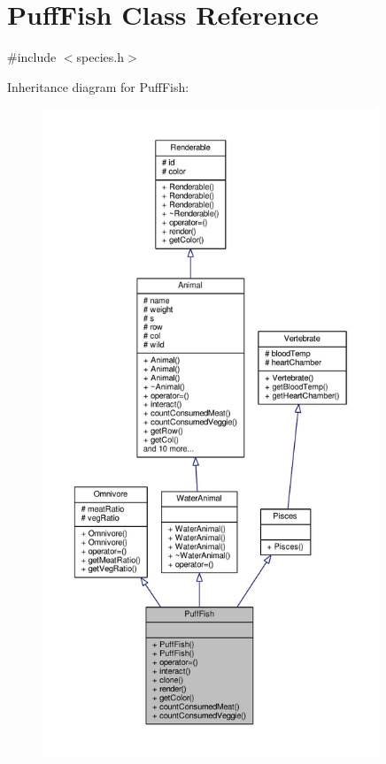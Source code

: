 \hypertarget{classPuffFish}{}\section{Puff\+Fish Class Reference}
\label{classPuffFish}


{\ttfamily \#include $<$species.\+h$>$}



Inheritance diagram for Puff\+Fish\+:
\nopagebreak
\begin{figure}[H]
\begin{center}
\leavevmode
\includegraphics[height=550pt]{classPuffFish__inherit__graph}
\end{center}
\end{figure}


